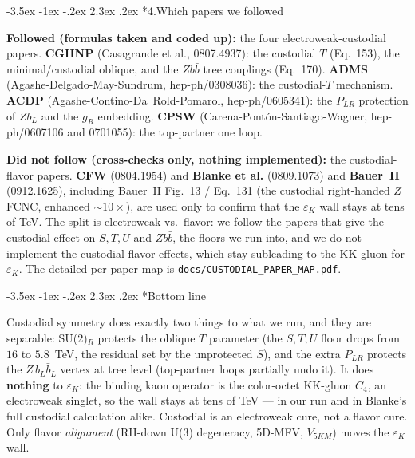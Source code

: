 \documentclass[11pt]{article}
\makeatletter
\providecommand{\FloatBarrier}{}
\renewcommand\section{\@startsection{section}{1}{\z@}%
  {-3.5ex \@plus -1ex \@minus -.2ex}%
  {2.3ex \@plus.2ex}%
  {\normalfont\Large\bfseries\color{accent}}}
\makeatother
\begin{document}
\FloatBarrier
\clearpage

\section*{4.\quad Which papers we followed}

\textbf{Followed (formulas taken and coded up):} the four electroweak-custodial
papers. \textbf{CGHNP} (Casagrande et al., 0807.4937): the custodial $T$ (Eq.~153),
the minimal/custodial oblique, and the $Z b\bar b$ tree couplings (Eq.~170).
\textbf{ADMS} (Agashe-Delgado-May-Sundrum, hep-ph/0308036): the custodial-$T$
mechanism. \textbf{ACDP} (Agashe-Contino-Da~Rold-Pomarol, hep-ph/0605341): the
$P_{LR}$ protection of $Z b_L$ and the $g_R$ embedding. \textbf{CPSW}
(Carena-Pont\'on-Santiago-Wagner, hep-ph/0607106 and 0701055): the top-partner one
loop.

\textbf{Did not follow (cross-checks only, nothing implemented):} the
custodial-flavor papers. \textbf{CFW} (0804.1954) and \textbf{Blanke et al.}
(0809.1073) and \textbf{Bauer~II} (0912.1625), including Bauer~II Fig.~13 / Eq.~131
(the custodial right-handed $Z$ FCNC, enhanced $\sim\!10\times$), are used only to
confirm that the $\varepsilon_K$ wall stays at tens of TeV. The split is electroweak
vs.\ flavor: we follow the papers that give the custodial effect on $S,T,U$ and
$Z b\bar b$, the floors we run into, and we do not implement the custodial flavor
effects, which stay subleading to the KK-gluon for $\varepsilon_K$. The detailed
per-paper map is \texttt{docs/CUSTODIAL\_PAPER\_MAP.pdf}.

\section*{Bottom line}

Custodial symmetry does exactly two things to what we run, and they are separable:
SU(2)$_R$ protects the oblique $T$ parameter (the $S,T,U$ floor drops from $16$ to
$5.8$~TeV, the residual set by the unprotected $S$), and the extra $P_{LR}$ protects
the $Z\,b_L\bar b_L$ vertex at tree level (top-partner loops partially undo it). It
does \textbf{nothing} to $\varepsilon_K$: the binding kaon operator is the
color-octet KK-gluon $C_4$, an electroweak singlet, so the wall stays at tens of
TeV --- in our run and in Blanke's full custodial calculation alike. Custodial is an
electroweak cure, not a flavor cure. Only flavor \emph{alignment} (RH-down U(3)
degeneracy, 5D-MFV, $V_{5KM}$) moves the $\varepsilon_K$ wall.
\end{document}
